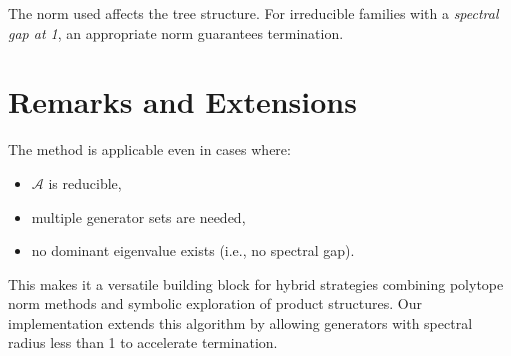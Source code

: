 The norm used affects the tree structure. For irreducible families with a \emph{spectral gap at 1}, an appropriate norm guarantees termination.

\section{Remarks and Extensions}

The method is applicable even in cases where:
\begin{itemize}
  \item $\mathcal{A}$ is reducible,
  \item multiple generator sets are needed,
  \item no dominant eigenvalue exists (i.e., no spectral gap).
\end{itemize}

This makes it a versatile building block for hybrid strategies combining polytope norm methods and symbolic exploration of product structures. Our implementation extends this algorithm by allowing generators with spectral radius less than 1 to accelerate termination.